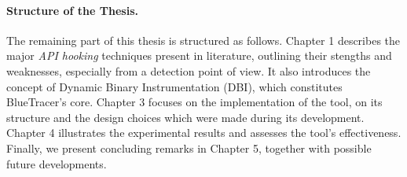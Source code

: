 \paragraph{Structure of the Thesis.}
The remaining part of this thesis is structured as follows.
Chapter 1 describes the major \textit{API hooking} techniques present in literature, outlining their stengths and weaknesses, especially from a detection point of view. It also introduces the concept of Dynamic Binary Instrumentation (DBI), which constitutes BlueTracer's core.
Chapter 3 focuses on the implementation of the tool, on its structure and the design choices which were made during its development.
Chapter 4 illustrates the experimental results and assesses the tool's effectiveness.
Finally, we present concluding remarks in Chapter 5, together with possible future developments.
